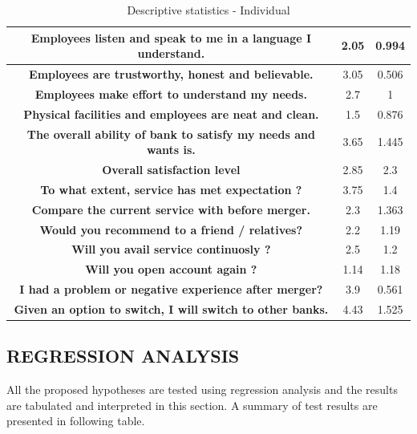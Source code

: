 \documentclass[a4paper, 14pt]{article}
\begin{document}
{\begin{table}[H]
\begin{tabular}{|c|c|c|}
\hline
\textbf{ Employees listen and speak to me in  a language I understand.} & 2.05 & 0.994 \\
\hline
\textbf{ Employees are trustworthy, honest and believable.} & 3.05 & 0.506 \\
\hline
\textbf{ Employees make effort to understand my needs.} & 2.7 & 1 \\
\hline
\textbf{ Physical facilities and employees are neat and clean.} & 1.5 & 0.876\\
\hline
\textbf{ The overall ability of bank to satisfy my needs and wants is.} & 3.65 & 1.445 \\
\hline
\textbf{ Overall satisfaction level} & 2.85 & 2.3 \\
\hline
\textbf{ To what extent, service has met expectation ?} & 3.75 & 1.4 \\
\hline
\textbf{ Compare the current service with before merger.} & 2.3 & 1.363 \\
\hline
\textbf{ Would you recommend to a friend / relatives?} & 2.2 & 1.19 \\
\hline
\textbf{ Will you avail service continuosly ?} & 2.5 & 1.2 \\
\hline
\textbf{ Will you open account again ?} & 1.14 & 1.18 \\
\hline
\textbf{ I had a problem or negative experience after merger?} & 3.9 & 0.561 \\
\hline
\textbf{ Given an option to switch, I will switch to other banks.} & 4.43 & 1.525 \\
\hline
\end{tabular}
\caption{Descriptive statistics - Individual}
\end{table}



\subsection{REGRESSION ANALYSIS}
All the proposed hypotheses are tested using regression analysis and the results are tabulated and interpreted in this section. A summary of test results are presented in following table.

}
\end{document}
